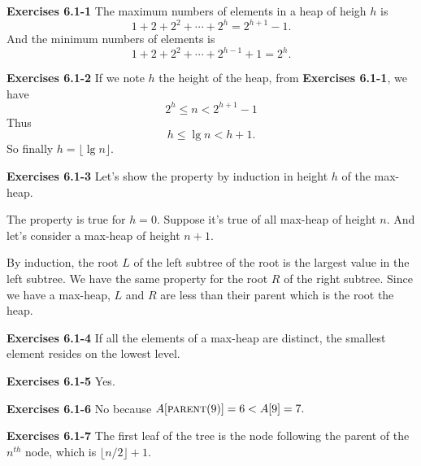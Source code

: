\documentclass[a4paper,12pt]{article}
\newcommand{\newpar}[1]
{\bigskip \noindent \textbf{Exercises #1} \newline}
\begin{document}
\newpar{6.1-1}
The maximum numbers of elements in a heap of heigh $h$ is
\[ 1 + 2 + 2^2 + \cdots + 2^h = 2^{h+1} - 1.\]
And the minimum numbers of elements is
\[ 1 + 2 + 2^2 + \cdots + 2^{h-1} + 1 = 2^h.\]

\newpar{6.1-2}
If we note $h$ the height of the heap, from \textbf{Exercises 6.1-1},
we have
\[ 2^h \le n < 2^{h+1} - 1\]
Thus
\[ h \le \lg n < h+1.\]
So finally $h = \lfloor \lg n\rfloor.$

\newpar{6.1-3}
Let's show the property by induction in height $h$ of the max-heap.

The property is true for $h=0$.  Suppose it's true of all max-heap of
height $n$.  And let's consider a max-heap of height $n+1$.

By induction, the root $L$ of the left subtree of the root is the
largest value in the left subtree.  We have the same property for the
root $R$ of the right subtree. Since we have a max-heap, $L$ and $R$
are less than their parent which is the root the heap.

\newpar{6.1-4}
If all the elements of a max-heap are distinct, the smallest element
resides on the lowest level.

\newpar{6.1-5}
Yes.

\newpar{6.1-6}
No because $A[\textsc{parent}(9)] = 6 < A[9] = 7.$

\newpar{6.1-7}
The first leaf of the tree is the node following the parent of the
$n^{th}$ node, which is $\lfloor n/2\rfloor + 1$.
\end{document}
